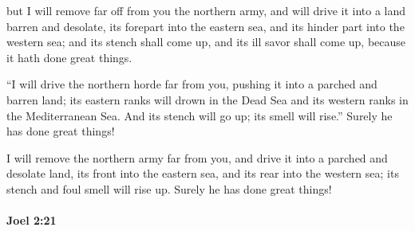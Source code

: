 			\begin{versebox}
					\item[BHS] 
					\item[LXX] 
					\item[ASV] but I will remove far off from you the northern army, and will drive it into a land barren and desolate, its forepart into the eastern sea, and its hinder part into the western sea; and its stench shall come up, and its ill savor shall come up, because it hath done great things.
					\item[NIV] “I will drive the northern horde far from you, pushing it into a parched and barren land; its eastern ranks will drown in the Dead Sea and its western ranks in the Mediterranean Sea. And its stench will go up; its smell will rise.” Surely he has done great things!
					\item[NRSV] I will remove the northern army far from you, and drive it into a parched and desolate land, its front into the eastern sea, and its rear into the western sea; its stench and foul smell will rise up. Surely he has done great things!
			\end{versebox}

		\paragraph{Joel 2:21} %
			\label{JOEL-2-21}

